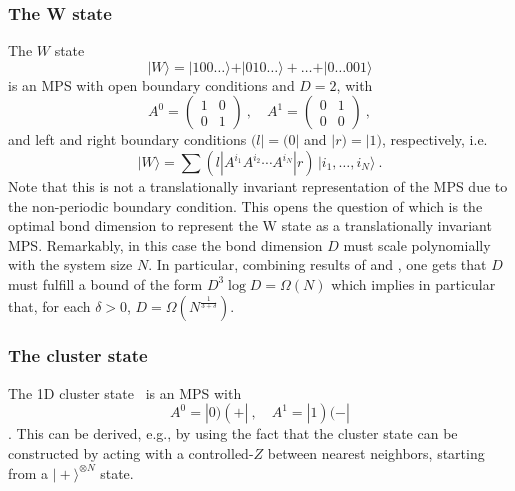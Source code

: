 \documentclass[rmp,aps,reprint,superscriptaddress,nobalancelastpage]{revtex4-1}
\newcommand{\ket}[1]{\vert#1\rangle}
\begin{document}
    \subsubsection{The W state} The $W$ state
    \[
        \ket{W}=\ket{100\dots}+\ket{010\dots}+\dots+\ket{0\dots001}
    \]
    is an MPS with open boundary conditions and $D=2$, with
    \begin{equation}
        A^{0}=\begin{pmatrix}1&0\\0&1\end{pmatrix}\ ,\quad
        A^{1}=\begin{pmatrix}0&1\\0&0\end{pmatrix}\ ,
    \end{equation}
    and left and right boundary conditions $(l|=(0|$ and $|r)=|1)$, respectively, i.e.
    \begin{equation}
        \ket W = \sum (l|A^{i_1}A^{i_2}\cdots A^{i_N}|r)\,
        \ket{i_1,\dots,i_N} \ .
    \end{equation}
    Note that this is not a translationally invariant representation of the MPS due to the non-periodic boundary condition. This opens the question of which is the optimal bond dimension to represent the W state as a translationally invariant MPS. Remarkably, in this case the bond dimension $D$ must scale polynomially with the system size $N$. In particular, combining results of \citet{perez-garcia:mps-reps} and \citet{michalek:wielandt-Dsquare}, one gets that $D$ must fulfill a bound of the form $D^3\log D =\Omega(N)$ which implies in particular that, for each $\delta>0$, $D=\Omega(N^{\frac{1}{3+\delta}})$.

    \subsubsection{The cluster state} The 1D cluster state~\cite{raussendorf:cluster-short} is an MPS with
    \[
        A^0=|0)(+|\ ,\quad A^1=|1)(-|
    \]
    \cite{verstraete:mbc-peps}.
    This can be derived, e.g., by using the fact that the cluster state can be constructed by acting with a controlled-$Z$ between nearest neighbors, starting from a $\ket{+}^{\otimes N}$ state.
\end{document}
